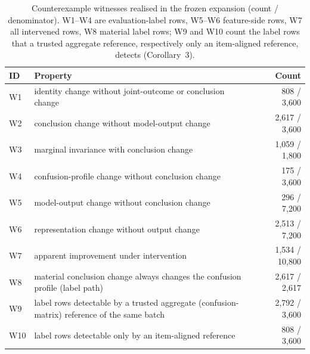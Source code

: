 \begin{table}[!tbp]
\caption{Counterexample witnesses realised in the frozen expansion (count / denominator). W1--W4 are evaluation-label rows, W5--W6 feature-side rows, W7 all intervened rows, W8 material label rows; W9 and W10 count the label rows that a trusted aggregate reference, respectively only an item-aligned reference, detects (Corollary~3).}
\label{tab:s-witnesses}
\centering
\scriptsize
\setlength{\tabcolsep}{3pt}
\begin{tabularx}{\columnwidth}{@{}l>{\raggedright\arraybackslash}Xr@{}}
\toprule
ID & Property & Count \\
\midrule
W1 & identity change without joint-outcome or conclusion change & 808 / 3,600 \\
W2 & conclusion change without model-output change & 2,617 / 3,600 \\
W3 & marginal invariance with conclusion change & 1,059 / 1,800 \\
W4 & confusion-profile change without conclusion change & 175 / 3,600 \\
W5 & model-output change without conclusion change & 296 / 7,200 \\
W6 & representation change without output change & 2,513 / 7,200 \\
W7 & apparent improvement under intervention & 1,534 / 10,800 \\
W8 & material conclusion change always changes the confusion profile (label path) & 2,617 / 2,617 \\
W9 & label rows detectable by a trusted aggregate (confusion-matrix) reference of the same batch & 2,792 / 3,600 \\
W10 & label rows detectable only by an item-aligned reference & 808 / 3,600 \\
\bottomrule
\end{tabularx}
\end{table}
